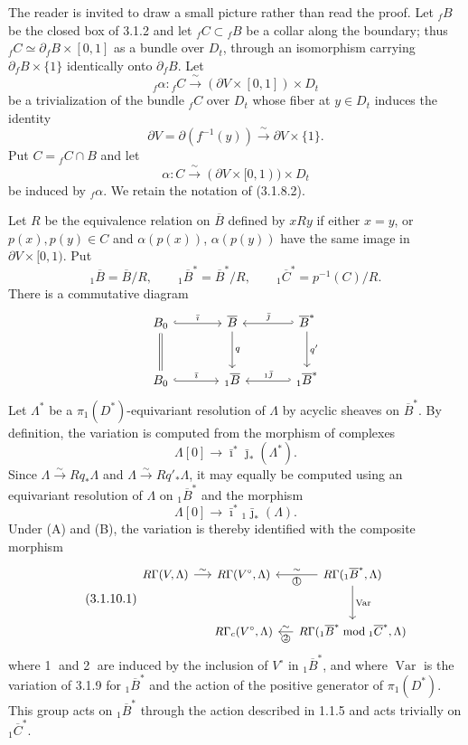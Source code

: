 The reader is invited to draw a small picture rather than read the
proof.  Let ${}_fB$ be the closed box of 3.1.2 and let
${}_fC\subset{}_fB$ be a collar along the boundary; thus
${}_fC\simeq\partial_fB\times[0,1]$ as a bundle over $D_t$, through
an isomorphism carrying $\partial_fB\times\{1\}$ identically onto
$\partial_fB$.  Let
\[
{}_f\alpha:{}_fC\xrightarrow{\ \sim\ }
(\partial V\times[0,1])\times D_t
\]
be a trivialization of the bundle ${}_fC$ over $D_t$ whose fiber at
$y\in D_t$ induces the identity
\[
\partial V=\partial(f^{-1}(y))
\xrightarrow{\ \sim\ }\partial V\times\{1\}.
\]
Put $C={}_fC\cap B$ and let
\[
\alpha:C\xrightarrow{\ \sim\ }
(\partial V\times[0,1))\times D_t
\]
be induced by ${}_f\alpha$.  We retain the notation of (3.1.8.2).

Let $R$ be the equivalence relation on $\overline B$ defined by
$xRy$ if either $x=y$, or $p(x),p(y)\in C$ and
$\alpha(p(x))$, $\alpha(p(y))$ have the same image in
$\partial V\times[0,1)$.  Put
\[
{}_1\overline B=\overline B/R,
\qquad
{}_1\overline B^*=\overline B^*/R,
\qquad
{}_1\overline C^*=p^{-1}(C)/R.
\]
There is a commutative diagram
\[
\begin{tikzcd}[column sep=large,row sep=large]
B_0 \arrow[r,hook,"\bar\imath"] \arrow[d,equal]
  & \overline B \arrow[d,"q"]
  & \overline B^* \arrow[l,hook',"\bar\jmath"'] \arrow[d,"q'"] \\
B_0 \arrow[r,hook,"\bar\imath"]
  & {}_1\overline B
  & {}_1\overline B^* \arrow[l,hook',"{}_1\bar\jmath"']
\end{tikzcd}
\]
Let $\Lambda^*$ be a $\pi_1(D^*)$-equivariant resolution of
$\Lambda$ by acyclic sheaves on $\overline B^*$.  By definition, the
variation is computed from the morphism of complexes
\[
\Lambda[0]\longrightarrow
\bar\imath^*\bar\jmath_*(\Lambda^*).
\]
Since $\Lambda\xrightarrow{\sim}Rq_*\Lambda$ and
$\Lambda\xrightarrow{\sim}Rq'_*\Lambda$, it may equally be computed
using an equivariant resolution of $\Lambda$ on
${}_1\overline B^*$ and the morphism
\[
\Lambda[0]\longrightarrow
\bar\imath^*{}_1\bar\jmath_*(\Lambda).
\]
Under (A) and (B), the variation is thereby identified with the
composite morphism
\begin{equation}\tag{3.1.10.1}
\begin{tikzcd}[column sep=small,row sep=large,cells={nodes={font=\small}}]
R\Gamma(V,\Lambda) \arrow[r,"\sim"]
  & R\Gamma(V^\circ,\Lambda)
  & R\Gamma({}_1\overline B^*,\Lambda)
      \arrow[l,"\sim"',"\text{\textcircled{1}}"]
      \arrow[d,"\operatorname{Var}"] \\
{}
  & R\Gamma_c(V^\circ,\Lambda)
  & R\Gamma({}_1\overline B^*\bmod{}_1\overline C^*,\Lambda)
      \arrow[l,"\sim"',"\text{\textcircled{2}}"]
\end{tikzcd}
\end{equation}
where \textcircled{1} and \textcircled{2} are induced by the inclusion
of $V^\circ$ in ${}_1\overline B^*$, and where
$\operatorname{Var}$ is the variation of 3.1.9 for
${}_1\overline B^*$ and the action of the positive generator of
$\pi_1(D^*)$.  This group acts on ${}_1\overline B^*$ through the
action described in 1.1.5 and acts trivially on
${}_1\overline C^*$.

